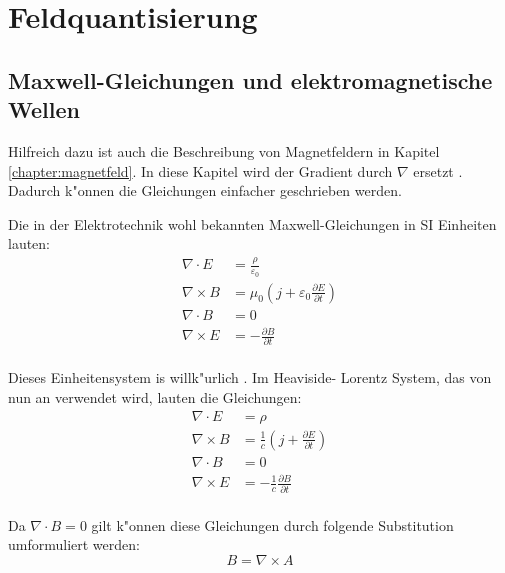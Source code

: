 \chapter{Feldquantisierung\label{chapter:feldquantisierung}}
\begin{refsection}

\printbibliography[heading=subbibliography]
\end{refsection}

\section{Maxwell-Gleichungen und elektromagnetische Wellen}

Hilfreich dazu ist auch die Beschreibung von Magnetfeldern in Kapitel \ref{chapter:magnetfeld}. In diese Kapitel wird der Gradient durch $\nabla$ ersetzt \cite{fq:nabla}. Dadurch k"onnen die Gleichungen einfacher geschrieben werden. 

Die in der Elektrotechnik wohl bekannten Maxwell-Gleichungen in SI Einheiten lauten:
\begin{equation}
\begin{split}
\nabla\cdot E &= \frac{\rho}{\varepsilon_0} \\
\nabla\times B &= \mu_0( j  + \varepsilon_0\frac{\partial E}{\partial t}) \\
\nabla\cdot B &=0 \\
\nabla\times E &= -\frac{\partial B }{\partial t}\\
\end{split}
\end{equation}

Dieses Einheitensystem is willk"urlich \cite{fq:em_units}. Im Heaviside-
Lorentz System, das von nun an verwendet wird, lauten die Gleichungen:
\begin{equation}
\begin{split}
\nabla\cdot E &= \rho \\
\nabla\times B &= \frac{1}{c}( j  + \frac{\partial E}{\partial t}) \\
\nabla\cdot B &=0 \\
\nabla\times E &= -\frac{1}{c} \frac{\partial B }{\partial t}\\
\end{split}
\end{equation}

Da $\nabla \cdot B = 0 $ gilt k"onnen diese Gleichungen durch folgende Substitution umformuliert werden:
\begin{equation}
B = \nabla\times A 
\end{equation}

